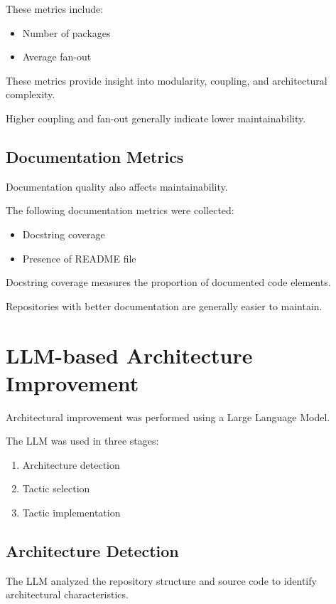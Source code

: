These metrics include:

\begin{itemize}
\item Number of packages
\item Average fan-out
\end{itemize}

These metrics provide insight into modularity, coupling, and architectural complexity.

Higher coupling and fan-out generally indicate lower maintainability.

\subsection{Documentation Metrics}

Documentation quality also affects maintainability.

The following documentation metrics were collected:

\begin{itemize}
\item Docstring coverage
\item Presence of README file
\end{itemize}

Docstring coverage measures the proportion of documented code elements.

Repositories with better documentation are generally easier to maintain.

\section{LLM-based Architecture Improvement}

Architectural improvement was performed using a Large Language Model.

The LLM was used in three stages:

\begin{enumerate}
\item Architecture detection
\item Tactic selection
\item Tactic implementation
\end{enumerate}

\subsection{Architecture Detection}

The LLM analyzed the repository structure and source code to identify architectural characteristics.

